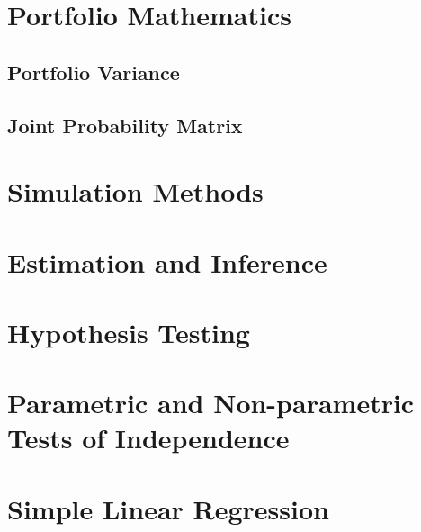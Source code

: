 \section{Portfolio Mathematics}
\label{sec:Portfolio Mathematics}
\subsection{Portfolio Variance} %

\subsection{Joint Probability Matrix} %


\section{Simulation Methods}
\label{sec:Simulation Methods}

\section{Estimation and Inference}
\label{sec:Estimation and Inference}

\section{Hypothesis Testing}
\label{sec:Hypothesis Testing}


\section{Parametric and Non-parametric Tests of Independence}
\label{sec:Parametric and Non-parametric Tests of Independence}

\section{Simple Linear Regression}
\label{sec:Simple Linear Regression}
